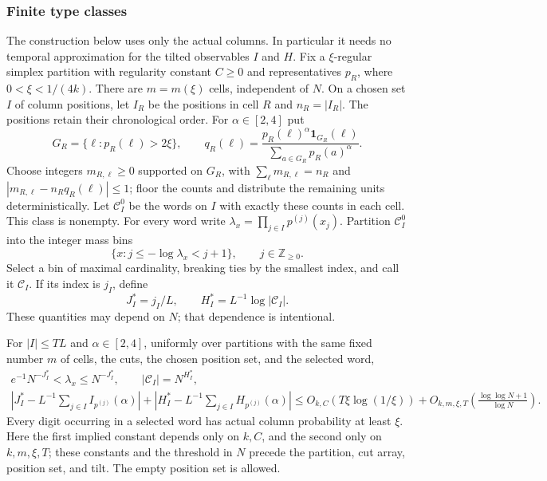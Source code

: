 \subsubsection{Finite type classes}

The construction below uses only the actual columns.  In particular it
needs no temporal approximation for the tilted observables $I$ and $H$.
Fix a $\xi$-regular simplex partition with regularity constant $C\ge0$ and representatives
$p_R$, where $0<\xi<1/(4k)$.  There are $m=m(\xi)$ cells, independent of $N$.
On a chosen set $I$ of column positions, let $I_R$ be the positions in cell
$R$ and $n_R=|I_R|$.  The positions retain their chronological order.
For $\alpha\in[2,4]$ put
\[
 G_R=\{\ell:p_R(\ell)>2\xi\},\qquad
 q_R(\ell)=\frac{p_R(\ell)^\alpha\mathbf1_{G_R}(\ell)}
                 {\sum_{a\in G_R}p_R(a)^\alpha}.
\]
Choose integers $m_{R,\ell}\ge0$ supported on $G_R$, with
$\sum_\ell m_{R,\ell}=n_R$ and
$|m_{R,\ell}-n_Rq_R(\ell)|\le1$; floor the counts and distribute the
remaining units deterministically.  Let $\mathcal C^0_I$ be the words on
$I$ with exactly these counts in each cell.  This class is nonempty.
For every word write $\lambda_x=\prod_{j\in I}p^{(j)}(x_j)$.
Partition $\mathcal C^0_I$ into the integer mass bins
\[
 \{x:j\le-\log\lambda_x<j+1\},\qquad j\in\mathbb Z_{\ge0}.
\]
Select a bin of maximal cardinality, breaking ties by the smallest index, and
call it $\mathcal C_I$.  If its index is $j_I$, define
\[
 J_I^*=j_I/L,\qquad H_I^*=L^{-1}\log|\mathcal C_I|.
\]
These quantities may depend on $N$; that dependence is intentional.

\begin{lemma}\label{lem:type-estimates}
For $|I|\le TL$ and $\alpha\in[2,4]$, uniformly over partitions with the same fixed number $m$ of cells, the cuts, the chosen
position set, and the selected word,
\begin{gather}
 e^{-1}N^{-J_I^*}<\lambda_x\le N^{-J_I^*},\qquad
 |\mathcal C_I|=N^{H_I^*},\label{eq:repair-bin-exact}\\
 \left|J_I^*-L^{-1}\sum_{j\in I}I_{p^{(j)}}(\alpha)\right|
 +\left|H_I^*-L^{-1}\sum_{j\in I}H_{p^{(j)}}(\alpha)\right|
 \le O_{k,C}(T\xi\log(1/\xi))
       +O_{k,m,\xi,T}\!\left(\frac{\log\log N+1}{\log N}\right).
 \label{eq:repair-types-error}
\end{gather}
Every digit occurring in a selected word has actual column probability
at least $\xi$.  Here the first implied constant depends only on $k,C$, and the second only on $k,m,\xi,T$; these constants and the threshold in $N$ precede the partition, cut array, position set, and tilt. The empty position set is allowed.
\end{lemma}

